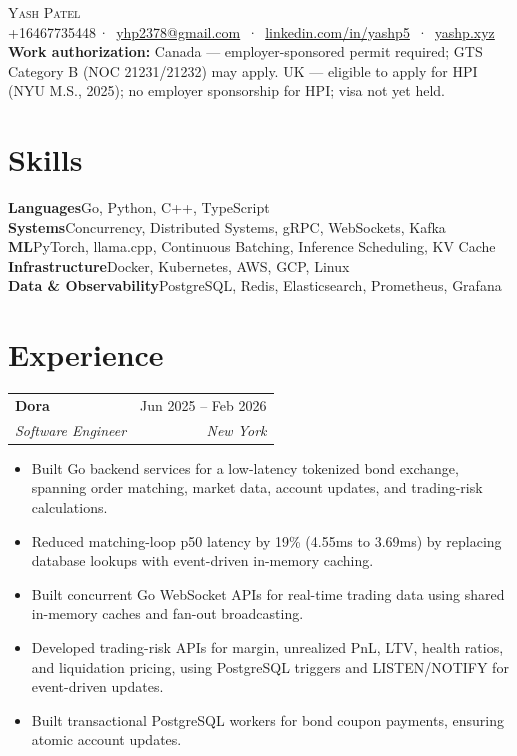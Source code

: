 \documentclass[letterpaper,12pt]{article}
\makeatletter
\newcommand{\entry}[4]{%
  \begin{tabularx}{\textwidth}{@{}X@{}r@{}}
    \textbf{#1} & {\small\color{muted}#2} \\
    {\small\itshape #3} & {\small\itshape\color{muted}#4} \\
  \end{tabularx}\vspace{3pt}
}
\newenvironment{bullets}
  {\begin{itemize}[leftmargin=1.1em, itemsep=0pt, topsep=0pt, parsep=0pt, label={\color{muted}\footnotesize\textbullet}]\fontsize{11}{13.0}\selectfont}
  {\end{itemize}\vspace{-3pt}}
\newcommand{\skill}[2]{\textbf{#1}\enspace {\color{muted}·}\enspace #2\\[-1pt]}
\makeatother
\begin{document}
\begin{center}
  {\huge\scshape Yash Patel}\\[1pt]
  {\small
    +16467735448\,{\color{muted}·}\,
    \href{mailto:yhp2378@gmail.com}{yhp2378@gmail.com}
    \,{\color{muted}·}\,
    \href{https://www.linkedin.com/in/yashp5/}{linkedin.com/in/yashp5}
    \,{\color{muted}·}\,
    \href{https://yashp.xyz/}{yashp.xyz}
  }\\[2pt]
  {\fontsize{9}{10.5}\selectfont\color{muted}
    \textbf{Work authorization:}\enspace
    \ifdefined\CANADA
      Canada --- employer-sponsored permit required; GTS Category B (NOC 21231/21232) may apply.
    \else
      UK --- eligible to apply for HPI (NYU M.S., 2025); no employer sponsorship for HPI; visa not yet held.
    \fi
  }
\end{center}
\vspace{-12pt}

\section{Skills}\vspace{1.2pt}
{\small
\skill{Languages}{Go, Python, C++, TypeScript}
\skill{Systems}{Concurrency, Distributed Systems, gRPC, WebSockets, Kafka}
\skill{ML}{PyTorch, llama.cpp, Continuous Batching, Inference Scheduling, KV Cache}
\skill{Infrastructure}{Docker, Kubernetes, AWS, GCP, Linux}
\skill{Data \& Observability}{PostgreSQL, Redis, Elasticsearch, Prometheus, Grafana}
}

\section{Experience}

\entry{Dora}{Jun 2025 -- Feb 2026}{Software Engineer}{New York}
\begin{bullets}
  \item Built Go backend services for a low-latency tokenized bond exchange, spanning order matching, market data, account updates, and trading-risk calculations.
  \item Reduced matching-loop p50 latency by 19\% (4.55ms to 3.69ms) by replacing database lookups with event-driven in-memory caching.
  \item Built concurrent Go WebSocket APIs for real-time trading data using shared in-memory caches and fan-out broadcasting.
  \item Developed trading-risk APIs for margin, unrealized PnL, LTV, health ratios, and liquidation pricing, using PostgreSQL triggers and LISTEN/NOTIFY for event-driven updates.
  \item Built transactional PostgreSQL workers for bond coupon payments, ensuring atomic account updates.
\end{bullets}
\end{document}
